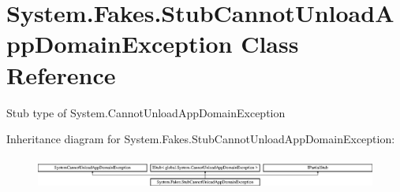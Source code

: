 \hypertarget{class_system_1_1_fakes_1_1_stub_cannot_unload_app_domain_exception}{\section{System.\-Fakes.\-Stub\-Cannot\-Unload\-App\-Domain\-Exception Class Reference}
\label{class_system_1_1_fakes_1_1_stub_cannot_unload_app_domain_exception}
}


Stub type of System.\-Cannot\-Unload\-App\-Domain\-Exception 


Inheritance diagram for System.\-Fakes.\-Stub\-Cannot\-Unload\-App\-Domain\-Exception\-:\begin{figure}[H]
\begin{center}
\leavevmode
\includegraphics[height=1.057601cm]{class_system_1_1_fakes_1_1_stub_cannot_unload_app_domain_exception}
\end{center}
\end{figure}
